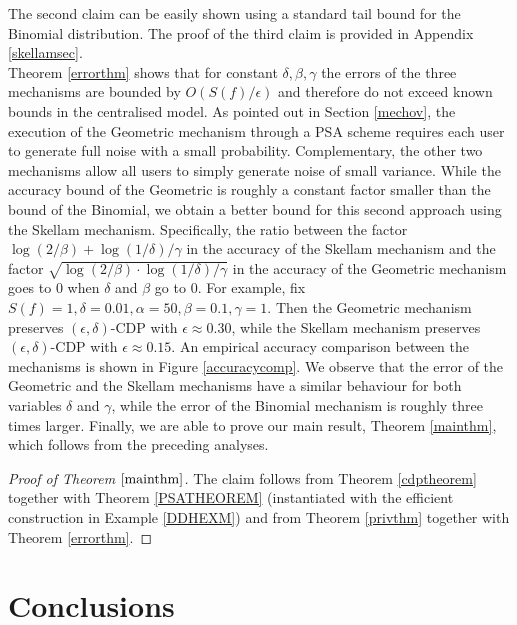 \documentclass[10pt]{extarticle}
\begin{document}
The second claim can be easily shown using a standard tail bound for the Binomial distribution. The proof of the third claim is provided in Appendix \ref{skellamsec}.\\
Theorem \ref{errorthm} shows that for constant $\delta,\beta,\gamma$ the errors of the three mechanisms are bounded by $O(S(f)/\epsilon)$ and therefore do not exceed known bounds in the centralised model. As pointed out in Section \ref{mechov}, the execution of the Geometric mechanism through a PSA scheme requires each user to generate full noise with a small probability. Complementary, the other two mechanisms allow all users to simply generate noise of small variance. While the accuracy bound of the Geometric is roughly a constant factor smaller than the bound of the Binomial, we obtain a better bound for this second approach using the Skellam mechanism. Specifically, the ratio between the factor $\log(2/\beta)+\log(1/\delta)/\gamma$ in the accuracy of the Skellam mechanism and the factor $\sqrt{\log(2/\beta)\cdot\log(1/\delta)/\gamma}$ in the accuracy of the Geometric mechanism goes to $0$ when $\delta$ and $\beta$ go to $0$. For example, fix $S(f)=1, \delta=0.01, \alpha=50, \beta=0.1, \gamma=1$. Then the Geometric mechanism preserves $(\epsilon,\delta)$-\mbox{\upshape\sffamily CDP} with $\epsilon\approx 0.30$, while the Skellam mechanism preserves $(\epsilon,\delta)$-\mbox{\upshape\sffamily CDP} with $\epsilon\approx 0.15$. An empirical accuracy comparison between the mechanisms is shown in Figure \ref{accuracycomp}. We observe that the error of the Geometric and the Skellam mechanisms have a similar behaviour for both variables $\delta$ and $\gamma$, while the error of the Binomial mechanism is roughly three times larger. Finally, we are able to prove our main result, Theorem \ref{mainthm}, which follows from the preceding analyses.

\begin{proof}[Proof of Theorem $\ref{mainthm}$] The claim follows from Theorem \ref{cdptheorem} together with Theorem \ref{PSATHEOREM} (instantiated with the efficient construction in Example \ref{DDHEXM}) and from Theorem \ref{privthm} together with Theorem \ref{errorthm}.
\end{proof}


\section{Conclusions}
\end{document}
